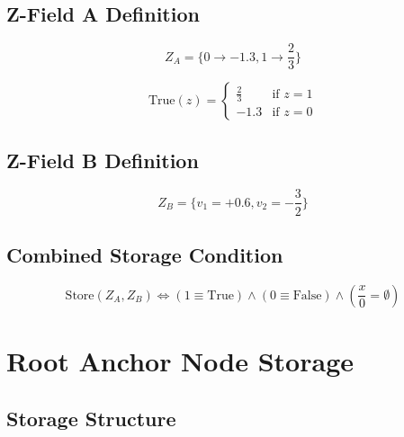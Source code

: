 \documentclass[12pt]{article}
\begin{document}
\subsection{Z-Field A Definition}

\begin{equation}
Z_A = \{0 \rightarrow -1.3, 1 \rightarrow \frac{2}{3}\}
\end{equation}

\begin{equation}
\text{True}(z) = \begin{cases}
\frac{2}{3} & \text{if } z = 1 \\
-1.3 & \text{if } z = 0
\end{cases}
\end{equation}

\subsection{Z-Field B Definition}

\begin{equation}
Z_B = \{v_1 = +0.6, v_2 = -\frac{3}{2}\}
\end{equation}

\subsection{Combined Storage Condition}

\begin{equation}
\boxed{
\text{Store}(Z_A, Z_B) \iff 
\left(1 \equiv \text{True}\right) \land 
\left(0 \equiv \text{False}\right) \land 
\left(\frac{x}{0} = \emptyset\right)
}
\end{equation}

\section{Root Anchor Node Storage}

\subsection{Storage Structure}
\end{document}
